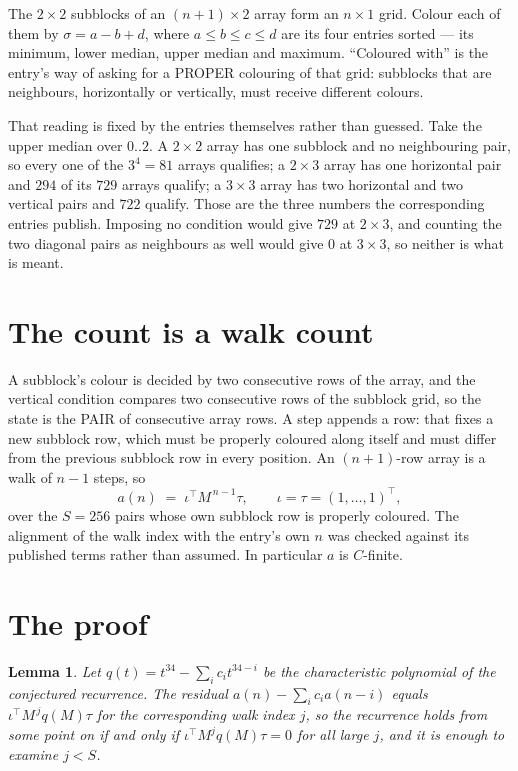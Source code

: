 \documentclass[11pt,a4paper]{article}
\theoremstyle{plain}
\newtheorem{lemma}[theorem]{Lemma}
\theoremstyle{definition}
\begin{document}
The $2\times2$ subblocks of an $(n+1)\times2$ array form an
$n\times1$ grid. Colour each of them by $\sigma=a-b+d$, where $a\le b\le c\le d$ are its four entries sorted --- its minimum, lower median, upper median and maximum. ``Coloured with'' is the entry's way of
asking for a PROPER colouring of that grid: subblocks that are neighbours, horizontally or
vertically, must receive different colours.

That reading is fixed by the entries themselves rather than guessed. Take the upper median
over $0..2$. A $2\times2$ array has one subblock and no neighbouring pair, so every one of the
$3^4=81$ arrays qualifies; a $2\times3$ array has one horizontal pair and $294$ of its $729$
arrays qualify; a $3\times3$ array has two horizontal and two vertical pairs and $722$
qualify. Those are the three numbers the corresponding entries publish. Imposing no condition
would give $729$ at $2\times3$, and counting the two diagonal pairs as neighbours as well
would give $0$ at $3\times3$, so neither is what is meant.

\section{The count is a walk count}

A subblock's colour is decided by two consecutive rows of the array, and
the vertical condition compares two consecutive rows of the subblock grid, so the state is the
PAIR of consecutive array rows. A step appends a row: that fixes a new subblock row, which
must be properly coloured along itself and must differ from the previous subblock row in every
position. An $(n+1)$-row array is a walk of $n-1$ steps, so
\[
a(n)\;=\;\iota^{\!\top}M^{\,n-1}\tau,\qquad\iota=\tau=(1,\dots,1)^{\!\top},
\]
over the $S=256$ pairs whose own subblock row is properly coloured.
The alignment of the walk index with the entry's own $n$ was checked against its published
terms rather than assumed. In particular $a$ is $C$-finite.

\section{The proof}

\begin{lemma}\label{lem:crit}
Let $q(t)=t^{34}-\sum_i c_it^{34-i}$ be the characteristic polynomial of the
conjectured recurrence. The residual $a(n)-\sum_ic_ia(n-i)$ equals
$\iota^{\!\top}M^{\,j}q(M)\tau$ for the corresponding walk index $j$, so the recurrence
holds from some point on if and only if $\iota^{\!\top}M^{j}q(M)\tau=0$ for all large $j$,
and it is enough to examine $j<S$.
\end{lemma}
\end{document}
